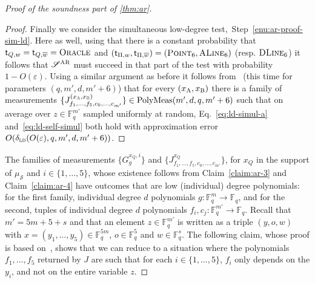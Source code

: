 \documentclass[11pt]{article}
\theoremstyle{definition}
\newcommand{\ol}[1]{\overline{#1}}
\newcommand{\F}{\ensuremath{\mathbb{F}}}
\newcommand{\ld}{\textsc{ld}}
\newcommand{\eps}{\varepsilon}
\newcommand{\sampler}{\mathcal{S}}
\newcommand{\strategy}{\mathscr{S}}
\newcommand{\gamestyle}[1]{\ensuremath{\textsc{#1}}\xspace}
\newcommand{\ar}{\gamestyle{AR}}
\newcommand{\labelstyle}[1]{\ensuremath{\textsc{#1}}\xspace}
\newcommand{\tvarstyle}[1]{\mathsf{#1}}
\newcommand{\tvar}{\ensuremath{\tvarstyle{t}}}
\newcommand{\alice}{\labelstyle{A}}
\newcommand{\bob}{\labelstyle{B}}
\newcommand{\oracle}{\labelstyle{Oracle}}
\newcommand{\typestyle}[1]{\ensuremath{\textsc{#1}}\xspace}
\newcommand{\Point}{\typestyle{Point}}
\newcommand{\ALine}{\typestyle{ALine}}
\newcommand{\DLine}{\typestyle{DLine}}
\newcommand{\simulpolymeas}[4]{\mathrm{PolyMeas}(#1,#2,#3, #4)}
\begin{document}
\begin{proof}[Proof of the soundness part of \cref{thm:ar}]
\begin{proof}
    Finally we consider the simultaneous low-degree
    test,~Step~\ref{enu:ar-proof-sim-ld}.
    Here as well, using that there is a constant probability that $\tvar_{Q,w} =
    \tvar_{Q,\ol{w}} = \oracle$ and $(\tvar_{\Pi,w}, \tvar_{\Pi, \ol{w}}) =
    (\Point_6, \ALine_6)$ (resp.
    $\DLine_6$) it follows that $\strategy^\ar$ must succeed in that part of the
    test with probability $1-O(\eps)$.
    Using a similar argument as before it follows from~
    (this time for parameters $(q,m',d,m'+6)$) that for every
    $(x_\alice,x_\bob)$ there is a family of measurements $\{J^{({x}_\alice,
      {x}_\bob)}_{f_1, \dots, f_5, c_0, \dots, c_{m'}}\} \in
    \simulpolymeas{m'}{d}{q}{m'+6}$ such that on average over $z\in \F_q^{m'}$
    sampled uniformly at random, Eq.~\eqref{eq:ld-simul-a}
    and~\eqref{eq:ld-self-simul} both hold with approximation error
    $O(\delta_{\ld}(O({\eps}), q, m', d, m'+6))$.
  \end{proof}

  The families of measurements $\{G^{x_Q,i}_g\}$ and
  $\{J^{x_Q}_{f_1,\ldots,f_5,c_0,\ldots,c_{m'}}\}$, for $x_Q$ in the support of
  $\mu_\sampler$ and $i\in\{1,\ldots,5\}$, whose existence follows from
  Claim~\ref{claim:ar-3} and Claim~\ref{claim:ar-4} have outcomes that are low
  (individual) degree polynomials: for the first family, individual degree $d$
  polynomials $g:\F_q^m\to \F_q$, and for the second, tuples of individual
  degree $d$ polynomials $f_i,c_j:\F_q^{m'} \to \F_q$.
  Recall that $m' = 5m + 5 +s$ and that an element $z\in \F_q^{m'}$ is written
  as a triple $(y,o,w)$ with $x=(y_1,\ldots,y_5)\in \F_q^{5m}$, $o\in\F_q^5$ and
  $w\in\F_q^s$.
  The following claim, whose proof is based on~, shows
  that we can reduce to a situation where the polynomials $f_1,\ldots,f_5$
  returned by $J$ are such that for each $i\in \{1,\ldots,5\}$, $f_i$ only
  depends on the $y_i$, and not on the entire variable $z$.
	

\end{proof}
\end{document}
